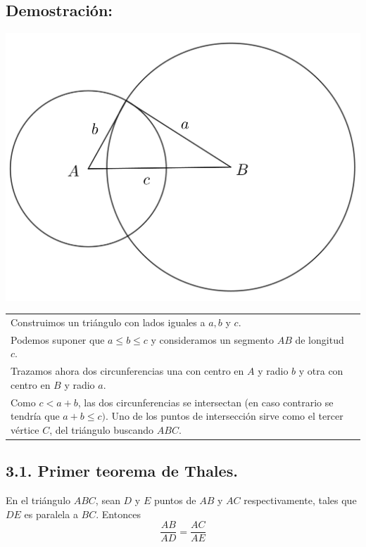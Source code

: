 \documentclass[12pt,a4paper]{article}
\begin{document}
\subsection*{Demostración:}
\begin{center}
\includegraphics[scale=0.45]{Imagenes/demo3.png} 
\end{center}
\begin{tabular}{p{15.9cm} p{1cm}}
\\Construimos un triángulo con lados iguales a $a, b$ y $c$. 
\\Podemos suponer que $a \leq b \leq c$ y consideramos un segmento $AB$ de longitud $c$.
\\Trazamos ahora dos circunferencias una con centro en $A$ y radio $b$ y otra con centro en $B$ y radio $a$.
\\Como $c<a+b$, las dos circunferencias se intersectan (en caso contrario se tendría que $a+b \leq c)$. Uno de los puntos de intersección sirve como el tercer vértice $C$, del triángulo buscando $ABC$.
\end{tabular}
\subsection*{3.1. Primer teorema de Thales.}
En el triángulo $ABC$, sean $D$ y $E$ puntos de $AB$
y $AC$ respectivamente, tales que $DE$ es paralela a $BC$. Entonces $$\dfrac{AB}{AD}=\dfrac{AC}{AE}$$
\end{document}
